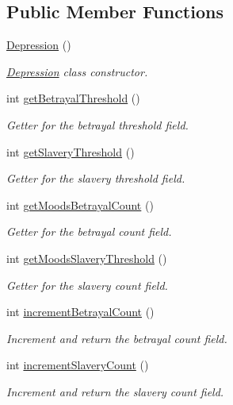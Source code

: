 \subsection*{Public Member Functions}
\begin{DoxyCompactItemize}
\item 
\hyperlink{a00008_ad2cd5c630475dceccc3fc62592c02899}{Depression} ()
\begin{DoxyCompactList}\small\item\em \hyperlink{a00008}{Depression} class constructor. \end{DoxyCompactList}\item 
int \hyperlink{a00015_a766902de5008b4ff54729075fe0b66a6}{get\-Betrayal\-Threshold} ()
\begin{DoxyCompactList}\small\item\em Getter for the betrayal threshold field. \end{DoxyCompactList}\item 
int \hyperlink{a00015_a8c5dda351cf131a2e2a30a1570e2c7e7}{get\-Slavery\-Threshold} ()
\begin{DoxyCompactList}\small\item\em Getter for the slavery threshold field. \end{DoxyCompactList}\item 
int \hyperlink{a00015_aae8ae123bc9d3bae48e08ad15528aa5b}{get\-Moods\-Betrayal\-Count} ()
\begin{DoxyCompactList}\small\item\em Getter for the betrayal count field. \end{DoxyCompactList}\item 
int \hyperlink{a00015_a859eb2f9bae00ce3604d0fea5a690900}{get\-Moods\-Slavery\-Threshold} ()
\begin{DoxyCompactList}\small\item\em Getter for the slavery count field. \end{DoxyCompactList}\item 
int \hyperlink{a00015_a322adb08d4a6f7dcd0eb00c77649d2d2}{increment\-Betrayal\-Count} ()
\begin{DoxyCompactList}\small\item\em Increment and return the betrayal count field. \end{DoxyCompactList}\item 
int \hyperlink{a00015_ac416312a82ad5afce4090858b47b0c96}{increment\-Slavery\-Count} ()
\begin{DoxyCompactList}\small\item\em Increment and return the slavery count field. \end{DoxyCompactList}\item 

\end{DoxyCompactItemize}
